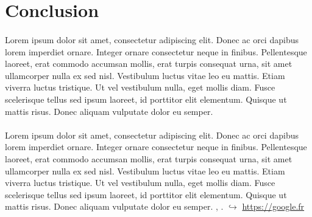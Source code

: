 \section{Conclusion}

\paragraph{}
Lorem ipsum dolor sit amet, consectetur adipiscing elit. Donec ac orci dapibus lorem imperdiet ornare. Integer ornare consectetur neque in finibus. Pellentesque laoreet, erat commodo accumsan mollis, erat turpis consequat urna, sit amet ullamcorper nulla ex sed nisl. Vestibulum luctus vitae leo eu mattis. Etiam viverra luctus tristique. Ut vel vestibulum nulla, eget mollis diam. Fusce scelerisque tellus sed ipsum laoreet, id porttitor elit elementum. Quisque ut mattis risus. Donec aliquam vulputate dolor eu semper. 
\paragraph{}
Lorem ipsum dolor sit amet, consectetur adipiscing elit. Donec ac orci dapibus lorem imperdiet ornare. Integer ornare consectetur neque in finibus. Pellentesque laoreet, erat commodo accumsan mollis, erat turpis consequat urna, sit amet ullamcorper nulla ex sed nisl. Vestibulum luctus vitae leo eu mattis. Etiam viverra luctus tristique. Ut vel vestibulum nulla, eget mollis diam. Fusce scelerisque tellus sed ipsum laoreet, id porttitor elit elementum. Quisque ut mattis risus. Donec aliquam vulputate dolor eu semper. \cite{dbscan-ref}, \cite{dbscan-sklearn-ref}.
$\hookrightarrow$ \url{https://google.fr}\\




